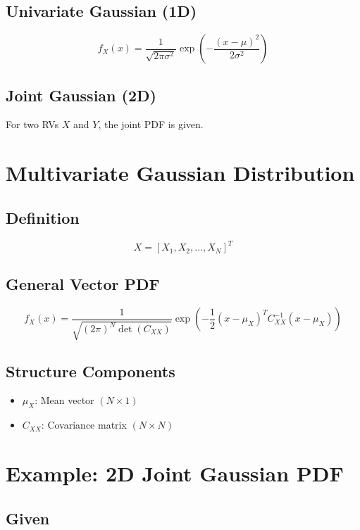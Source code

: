 \documentclass[12pt]{article}
\begin{document}
\subsection{Univariate Gaussian (1D)}

\[
f_X(x) =
\frac{1}{\sqrt{2\pi\sigma^2}}
\exp\left(-\frac{(x-\mu)^2}{2\sigma^2}\right)
\]

\subsection{Joint Gaussian (2D)}

For two RVs $X$ and $Y$, the joint PDF is given.

\section{Multivariate Gaussian Distribution}

\subsection{Definition}

\[
X = [X_1, X_2, \ldots, X_N]^T
\]

\subsection{General Vector PDF}

\[
f_X(x) =
\frac{1}{\sqrt{(2\pi)^N \det(C_{XX})}}
\exp\left(-\frac{1}{2}(x-\mu_X)^T C_{XX}^{-1}(x-\mu_X)\right)
\]

\subsection{Structure Components}

\begin{itemize}
\item $\mu_X$: Mean vector $(N \times 1)$
\item $C_{XX}$: Covariance matrix $(N \times N)$
\end{itemize}

\section{Example: 2D Joint Gaussian PDF}

\subsection{Given}
\end{document}
